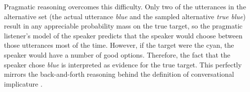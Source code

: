 \documentclass[11pt,letterpaper]{article}
\newcommand{\Listener}{L}
\newcommand{\Speaker}{S}
\renewcommand{\|}{\mid}
\newcommand{\secref}[1]{Section~\ref{#1}}
\newcommand{\Tabref}[1]{Table~\ref{#1}}
\newcommand{\ndg}[1]{\textcolor{Green}{[ndg: #1]}}
\begin{document}
Pragmatic reasoning overcomes this difficulty. Only two of the utterances in the
alternative set (the actual utterance \textit{blue} and the sampled alternative
\textit{true blue}) result in any appreciable probability mass on the true target,
so the pragmatic listener's model of the speaker predicts that the speaker
would choose between those utterances most of the time. However, if the target
were the cyan, the speaker would have a number of good options. Therefore, the
fact that the speaker chose \textit{blue} is interpreted as evidence for the
true target. This perfectly mirrors the back-and-forth reasoning behind the
definition of conversational implicature \cite{Grice75}.

\end{document}
